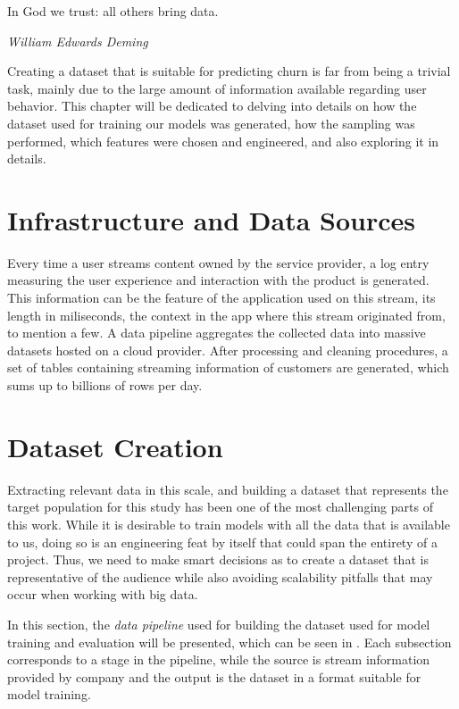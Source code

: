 \documentclass{kththesis}
\begin{document}
\epigraph{In God we trust: all others bring data.}{\textit{William Edwards Deming}}

Creating a dataset that is suitable for predicting churn is far from being a trivial task, mainly due to the large amount of information available regarding user behavior. This chapter will be dedicated to delving into details on how the dataset used for training our models was generated, how the sampling was performed, which features were chosen and engineered, and also exploring it in details.

\section{Infrastructure and Data Sources}

Every time a user streams content owned by the service provider, a log entry measuring the user experience and interaction with the product is generated. This information can be the feature of the application used on this stream, its length in miliseconds, the context in the app where this stream originated from, to mention a few. A data pipeline aggregates the collected data into massive datasets hosted on a cloud provider. After processing and cleaning procedures, a set of tables containing streaming information of customers are generated, which sums up to billions of rows per day. 

\section{Dataset Creation}

Extracting relevant data in this scale, and building a dataset that represents the target population for this study has been one of the most challenging parts of this work. While it is desirable to train models with all the data that is available to us, doing so is an engineering feat by itself that could span the entirety of a project. Thus, we need to make smart decisions as to create a dataset that is representative of the audience while also avoiding scalability pitfalls that may occur when working with big data.

In this section, the \emph{data pipeline} used for building the dataset used for model training and evaluation will be presented, which can be seen in . Each subsection corresponds to a stage in the pipeline, while the source is stream information provided by company and the output is the dataset in a format suitable for model training.
\end{document}
